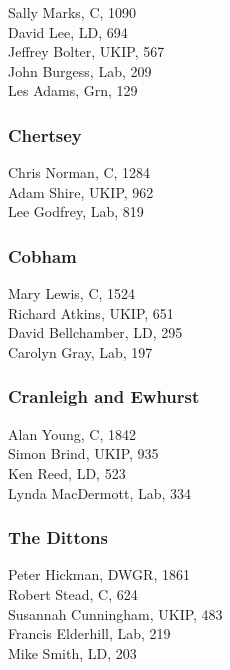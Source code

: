 \documentclass[a4paper,openany,10pt]{book}
\begin{document}
Sally Marks, C, 1090\\
David Lee, LD, 694\\
Jeffrey Bolter, UKIP, 567\\
John Burgess, Lab, 209\\
Les Adams, Grn, 129\\


\subsubsection*{Chertsey}



Chris Norman, C, 1284\\
Adam Shire, UKIP, 962\\
Lee Godfrey, Lab, 819\\


\subsubsection*{Cobham}



Mary Lewis, C, 1524\\
Richard Atkins, UKIP, 651\\
David Bellchamber, LD, 295\\
Carolyn Gray, Lab, 197\\


\subsubsection*{Cranleigh and Ewhurst}



Alan Young, C, 1842\\
Simon Brind, UKIP, 935\\
Ken Reed, LD, 523\\
Lynda MacDermott, Lab, 334\\


\subsubsection*{The Dittons}



Peter Hickman, DWGR, 1861\\
Robert Stead, C, 624\\
Susannah Cunningham, UKIP, 483\\
Francis Elderhill, Lab, 219\\
Mike Smith, LD, 203\\
\end{document}
